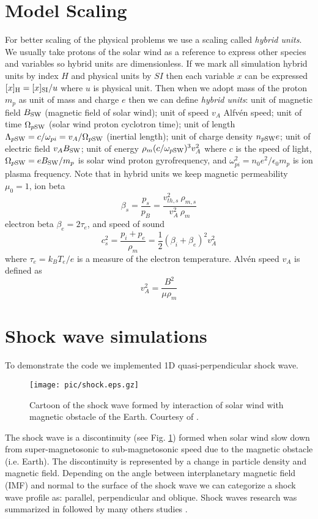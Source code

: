 \documentclass[oneside,branding,toc,article]{satdoc}
\begin{document}
\section{Model Scaling}
For better scaling of the physical problems we use a scaling called
\emph{hybrid units}. We usually take protons of the solar wind as a reference
to express other species and variables so hybrid units are dimensionless. If we
mark all simulation hybrid units by index $H$ and physical units by $SI$ then
each variable $x$ can be expressed $[x]_{\rm H} = [x]_{\rm SI} / u$ where $u$
is physical unit. Then when we adopt mass of the proton $m_p$ as unit of mass
and charge $e$ then we can define \emph{hybrid units}: unit of magnetic field
$B_{\rm SW}$ (magnetic field of solar wind); unit of speed $v_A$ Alfv\'en
speed; unit of time $\Omega_{p \rm SW}$ (solar wind proton cyclotron time);
unit of length $\Lambda_{p \rm SW} = c/\omega_{pi} = v_A / \Omega_{p \rm SW}$
(inertial length); unit of charge density $n_{p \rm SW} e$; unit of electric
field $v_A B_{\rm SW}$; unit of energy $\rho_m (c/\omega_{p \rm SW})^3 v_A^2$
where $c$ is the speed of light, $\Omega_{p \rm SW} = e B_{\rm SW} / m_p$ is
solar wind proton gyrofrequency, and $\omega_{pi}^2 = n_0 e^2 / \epsilon_0 m_p$
is ion plasma frequency. Note that in hybrid units we keep magnetic
permeability $\mu_0 = 1$, ion beta
\begin{equation}
  \label{eq:betai}
  \beta_s = \frac{p_s}{p_B} = \frac{v_{th,s}^2 ~ \rho_{m,s}}{v_A^2 ~ \rho_m}
\end{equation}
electron beta $\beta_e = 2 \tau_e$, and speed of sound
\begin{equation}
  \label{eq:cs}
  c_s^2 = \frac{p_i + p_e}{\rho_m} = \frac{1}{2}(\beta_i + \beta_e)^2 v_A^2
\end{equation}
where $\tau_e = k_B T_e/e$ is a measure of the electron temperature. Alv\'en
speed $v_A$ is defined as
\begin{equation}
  \label{eq:va}
  v_A^2 = \frac{B^2}{\mu \rho_m}
\end{equation}

\section{Shock wave simulations}
To demonstrate the code we implemented 1D quasi-perpendicular shock wave. 
\begin{figure}[!h]
  \centering
  \texttt{[image: pic/shock.eps.gz]}
  \caption{Cartoon of the shock wave formed by interaction of solar wind with
    magnetic obstacle of the Earth. Courtesy of \cite{bt96}.}
  \label{fig:shock}
\end{figure}
The shock wave is a discontinuity (see Fig. \ref{fig:shock}) formed when solar
wind slow down from super-magnetosonic to sub-magnetosonic speed due to the
magnetic obstacle (i.e. Earth). The discontinuity is represented by a change in
particle density and magnetic field.  Depending on the angle between
interplanetary magnetic field (IMF) and normal to the surface of the shock wave
we can categorize a shock wave profile as: parallel, perpendicular and oblique.
Shock waves research was summarized in \cite{kennel85} followed by many others
studies \cite{winske85, thomas89, hema97}.
\end{document}
